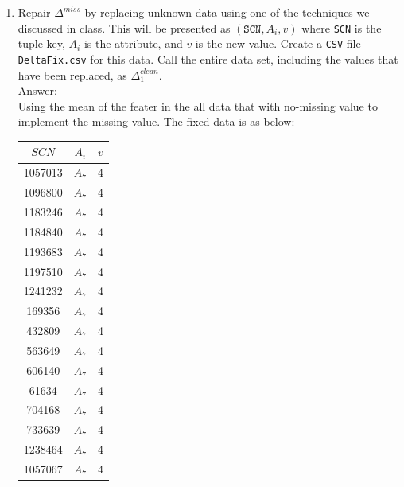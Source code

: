\documentclass{article}
\begin{document}
\begin{enumerate}
\begin{enumerate}
\begin{enumerate}
  \end{enumerate}
 \item Repair $\Delta^{miss}$ by replacing unknown data using one of the techniques we discussed in class.  This will be  presented as $(\texttt{SCN}, A_i, v)$ where \texttt{SCN} is the tuple key, $A_i$ is the attribute, and $v$ is the new value.
 Create a \texttt{CSV} file \texttt{DeltaFix.csv} for this data.  Call the entire data set, including the values that have been replaced, as $\Delta_1^{clean}$.\\
 Answer:\\
 Using the mean of  the feater in the all data that with no-missing value to implement the missing value. The fixed data is as below:
 \begin{center}
 	\begin{tabular}{ccc}
 		$SCN$ & $A_i$ & $v$\\ \hline \hline
 		 1057013 & $A_7$ & 4\\
 		  1096800  & $A_7$ & 4\\
 		 1183246  & $A_7$ & 4\\
 		 1184840  & $A_7$ & 4\\
 		1193683  & $A_7$ & 4\\
 		 1197510  & $A_7$ & 4\\
 		1241232  & $A_7$ & 4\\
 		   169356 & $A_7$ & 4\\
 		  432809  & $A_7$ & 4\\
 		  563649  & $A_7$ & 4\\
 		  606140 & $A_7$ & 4\\
 		   61634  & $A_7$ & 4\\
 		  704168  & $A_7$ & 4\\
         733639  & $A_7$ & 4\\
 		 1238464  & $A_7$ & 4\\
 		 1057067  & $A_7$ & 4\\
 	\end{tabular}
 \end{center}
 \end{enumerate} 
 

\end{enumerate}
\end{document}
